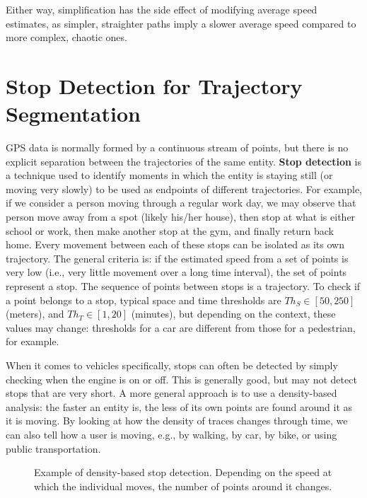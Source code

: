 Either way, simplification has the side effect of modifying average speed estimates, as simpler, straighter paths imply a slower average speed compared to more complex, chaotic ones.

\section{Stop Detection for Trajectory Segmentation}

GPS data is normally formed by a continuous stream of points, but there is no explicit separation between the trajectories of the same entity. \textbf{Stop detection} is a technique used to identify moments in which the entity is staying still (or moving very slowly) to be used as endpoints of different trajectories. For example, if we consider a person moving through a regular work day, we may observe that person move away from a spot (likely his/her house), then stop at what is either school or work, then make another stop at the gym, and finally return back home. Every movement between each of these stops can be isolated as its own trajectory. The general criteria is: if the estimated speed from a set of points is very low (i.e., very little movement over a long time interval), the set of points represent a stop. The sequence of points between stops is a trajectory. To check if a point belongs to a stop, typical space and time thresholds are $Th_S \in [50, 250]$ (meters), and $Th_T \in [1, 20]$ (minutes), but depending on the context, these values may change: thresholds for a car are different from those for a pedestrian, for example.

When it comes to vehicles specifically, stops can often be detected by simply checking when the engine is on or off. This is generally good, but may not detect stops that are very short. A more general approach is to use a density-based analysis: the faster an entity is, the less of its own points are found around it as it is moving. By looking at how the density of traces changes through time, we can also tell how a user is moving, e.g., by walking, by car, by bike, or using public transportation.

\begin{figure}[h]
    \centering
    
    \caption{Example of density-based stop detection. Depending on the speed at which the individual moves, the number of points around it changes.}
\end{figure}

